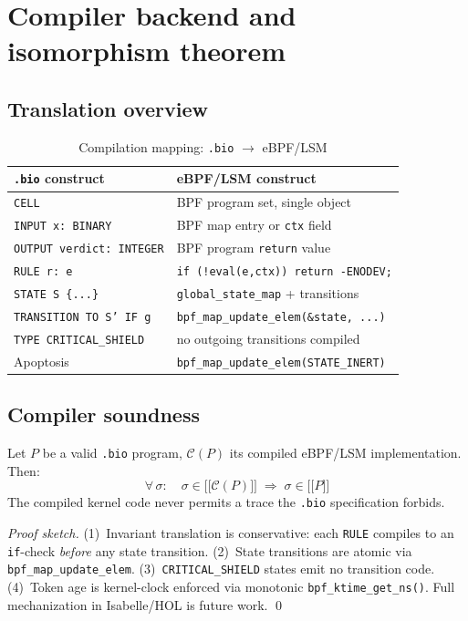 \documentclass[11pt,a4paper,twoside]{article}
\newcommand{\sem}[1]{\mathopen{[\![}#1\mathclose{]\!]}}
\begin{document}
\section{Compiler backend and isomorphism theorem}

\subsection{Translation overview}

\begin{table}[H]
\centering
\caption{Compilation mapping: \texttt{.bio} $\to$ eBPF/LSM}
\begin{tabular}{@{}ll@{}}
\toprule
\textbf{\texttt{.bio} construct} & \textbf{eBPF/LSM construct} \\ \midrule
\texttt{CELL} & BPF program set, single object \\
\texttt{INPUT x: BINARY} & BPF map entry or \texttt{ctx} field \\
\texttt{OUTPUT verdict: INTEGER} & BPF program \texttt{return} value \\
\texttt{RULE r: e} & \texttt{if (!eval(e,ctx)) return -ENODEV;} \\
\texttt{STATE S \{...\}} & \texttt{global\_state\_map} + transitions \\
\texttt{TRANSITION TO S' IF g} & \texttt{bpf\_map\_update\_elem(\&state, ...)} \\
\texttt{TYPE CRITICAL\_SHIELD} & no outgoing transitions compiled \\
Apoptosis & \texttt{bpf\_map\_update\_elem(STATE\_INERT)} \\
\bottomrule
\end{tabular}
\end{table}

\subsection{Compiler soundness}

\begin{theorem}\label{thm:soundness}
Let $P$ be a valid \texttt{.bio} program, $\mathcal{C}(P)$ its compiled eBPF/LSM
implementation. Then:
\[
  \forall\,\sigma:\quad \sigma \in \sem{\mathcal{C}(P)} \;\Longrightarrow\; \sigma \in \sem{P}
\]
The compiled kernel code never permits a trace the \texttt{.bio} specification forbids.
\end{theorem}
\begin{proof}[Proof sketch]
(1)~Invariant translation is conservative: each \texttt{RULE} compiles to an
\texttt{if}-check \emph{before} any state transition.
(2)~State transitions are atomic via \texttt{bpf\_map\_update\_elem}.
(3)~\texttt{CRITICAL\_SHIELD} states emit no transition code.
(4)~Token age is kernel-clock enforced via monotonic \texttt{bpf\_ktime\_get\_ns()}.
Full mechanization in Isabelle/HOL is future work. \qed
\end{proof}
\end{document}
